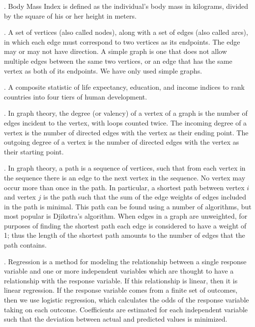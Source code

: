 \documentclass[oneside,12pt]{report}
\begin{document}
\vspace{8pt}
. Body Mass Index is defined as the individual's body mass in kilograms, divided by the square of his or her height in meters.

\vspace{8pt}
. A set of vertices (also called nodes), along with a set of edges (also called arcs), in which each edge must correspond to two vertices as its endpoints. The edge may or may not have direction. A simple graph is one that does not allow multiple edges between the same two vertices, or an edge that has the same vertex as both of its endpoints. We have only used simple graphs.

\vspace{8pt}
. A composite statistic of life expectancy, education, and income indices to rank countries into four tiers of human development.

\vspace{8pt} . In graph theory, the degree (or valency) of a vertex of a graph is the number of edges incident to the vertex, with loops counted twice. The incoming degree of a vertex is the number of directed edges with the vertex as their ending point. The outgoing degree of a vertex is the number of directed edges with the vertex as their starting point.

\vspace{8pt} . In graph theory, a path is a sequence of vertices, such that from each vertex in the sequence there is an edge to the next vertex in the sequence. No vertex may occur more than once in the path. In particular, a shortest path between vertex $i$ and vertex $j$ is the path such that the sum of the edge weights of edges included in the path is minimal. This path can be found using a number of algorithms, but most popular is Djikstra's algorithm. When edges in a graph are unweighted, for purposes of finding the shortest path each edge is considered to have a weight of 1; thus the length of the shortest path amounts to the number of edges that the path contains.

\vspace{8pt} . Regression is a method for modeling the relationship between a single response variable and one or more independent variables which are thought to have a relationship with the response variable. If this relationship is linear, then it is linear regression. If the response variable comes from a finite set of outcomes, then we use logistic regression, which calculates the odds of the response variable taking on each outcome. Coefficients are estimated for each independent variable such that the deviation between actual and predicted values is minimized.
\end{document}
